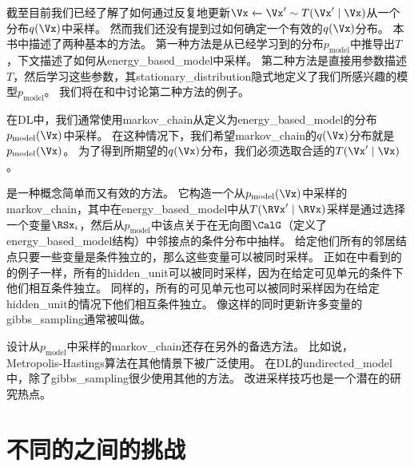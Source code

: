 截至目前我们已经了解了如何通过反复地更新$\Vx \xleftarrow{} \Vx'\sim T(\Vx'\mid\Vx)$从一个分布$q(\Vx)$中采样。
然而我们还没有提到过如何确定一个有效的$q(\Vx)$分布。
本书中描述了两种基本的方法。
第一种方法是从已经学习到的分布$p_{\text{model}}$中推导出$T$，下文描述了如何从\gls{energy_based_model}中采样。
第二种方法是直接用参数描述$T$，然后学习这些参数，其\gls{stationary_distribution}隐式地定义了我们所感兴趣的模型$p_{\text{model}}$。
我们将在和中讨论第二种方法的例子。


在\gls{DL}中，我们通常使用\gls{markov_chain}从定义为\gls{energy_based_model}的分布$p_{\text{model}}(\Vx)$中采样。
在这种情况下，我们希望\gls{markov_chain}的$q(\Vx)$分布就是$p_{\text{model}}(\Vx)$。
为了得到所期望的$q(\Vx)$分布，我们必须选取合适的$T(\Vx'\mid \Vx)$。


是一种概念简单而又有效的方法。
它构造一个从$p_{\text{model}}(\Vx)$中采样的\gls{markov_chain}，其中在\gls{energy_based_model}中从$T(\RVx'\mid \RVx)$采样是通过选择一个变量$\RSx_i$，然后从$p_{\text{model}}$中该点关于在无向图$\CalG$（定义了\gls{energy_based_model}结构）中邻接点的条件分布中抽样。
给定他们所有的邻居结点只要一些变量是条件独立的，那么这些变量可以被同时采样。
正如在中看到的的例子一样，所有的\gls{hidden_unit}可以被同时采样，因为在给定可见单元的条件下他们相互条件独立。
同样的，所有的可见单元也可以被同时采样因为在给定\gls{hidden_unit}的情况下他们相互条件独立。
像这样的同时更新许多变量的\gls{gibbs_sampling}通常被叫做。

设计从$p_{\text{model}}$中采样的\gls{markov_chain}还存在另外的备选方法。
比如说，Metropolis-Hastings算法在其他情景下被广泛使用。
在\gls{DL}的\gls{undirected_model}中，除了\gls{gibbs_sampling}很少使用其他的方法。
改进采样技巧也是一个潜在的研究热点。


\section{不同的之间的挑战}
\label{sec:the_challenge_of_mixing_between_separated_modes}

